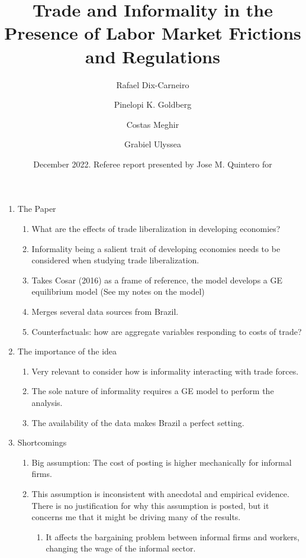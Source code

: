 \documentclass[12pt,oneside,reqno]{amsart}
\title{Trade and Informality in the Presence of Labor Market Frictions and Regulations}
\author{Rafael Dix-Carneiro \and Pinelopi K. Goldberg \and Costas Meghir \and Grabiel Ulyssea}
\date{December 2022. Referee report presented by Jose M. Quintero for}
\begin{document}
\maketitle 

\begin{enumerate}[leftmargin=0pt, label=\textbf{\arabic*.}]
    \item The Paper
    \begin{enumerate}[label=\textbf{\alph*)}]
        \item What are the effects of trade liberalization in developing economies?
        \item Informality being a salient trait of developing economies needs to be considered when studying trade liberalization. 
        \item Takes Cosar (2016) as a frame of reference, the model develops a GE equilibrium model (See my notes on the model) 
        \item Merges several data sources from Brazil. 
        \item Counterfactuals: how are aggregate variables responding to costs of trade? 
    \end{enumerate}
    \item The importance of the idea
    \begin{enumerate}[label=\textbf{\alph*)}]
        \item Very relevant to consider how is informality interacting with trade forces. 
        \item The sole nature of informality requires a GE model to perform the analysis. 
        \item The availability of the data makes Brazil a perfect setting. 
    \end{enumerate}
    \item Shortcomings
    \begin{enumerate}[label=\textbf{\alph*)}]
        \item Big assumption: The cost of posting is higher mechanically for informal firms. 
        \item This assumption is inconsistent with anecdotal and empirical evidence. There is no justification for why this assumption is posted, but it concerns me that it might be driving many of the results. 
        \begin{enumerate}[label=\textbf{\roman*.}]
            \item It affects the bargaining problem between informal firms and workers, changing the wage of the informal sector. 

\end{enumerate}
\end{enumerate}
\end{enumerate}
\end{document}
